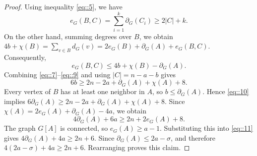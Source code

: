\documentclass[10pt,a4paper]{amsart}
\begin{document}
\begin{proof}
    Using inequality \eqref{eq::5}, we have
    \begin{equation}\label{eq::8}
      e_G(B,C)=\sum_{i=1}^k\partial_G(C_i)\geq2|C|+k.
    \end{equation}
    On the other hand, summing degrees over $B$, we obtain
    $4b+\chi(B)=\sum_{v\in B}d_G(v)=2e_G(B)+\partial_G(A)+e_G(B,C)$.
    Consequently,
    \begin{equation}\label{eq::9}
      e_G(B,C)\leq 4b+\chi(B)-\partial_G(A).
    \end{equation}
    Combining \eqref{eq::7}--\eqref{eq::9} and using $|C|=n-a-b$ gives
    \begin{equation}\label{eq::10}
      6b\geq 2n-2a+\partial_G(A)+\chi(A)+8.
    \end{equation}
    Every vertex of $B$ has at least one neighbor in $A$, so $b\le \partial_G(A)$. Hence \eqref{eq::10} implies
    $
      6\partial_G(A)\geq 2n-2a+\partial_G(A)+\chi(A)+8$.
    Since $\chi(A)=2e_G(A)+\partial_G(A)-4a$,
    we obtain
    \begin{equation}\label{eq::11}
      4\partial_G(A)+6a\geq 2n+2e_G(A)+8.
    \end{equation}
    The graph $G[A]$ is connected, so $e_G(A)\geq a-1$. Substituting this into \eqref{eq::11} gives $4\partial_G(A)+4a\geq 2n+6$. Since $\partial_G(A)\leq2a-\sigma$, and therefore $4(2a-\sigma)+4a\ge2n+6$. Rearranging proves this claim.
  \end{proof}
\end{document}
